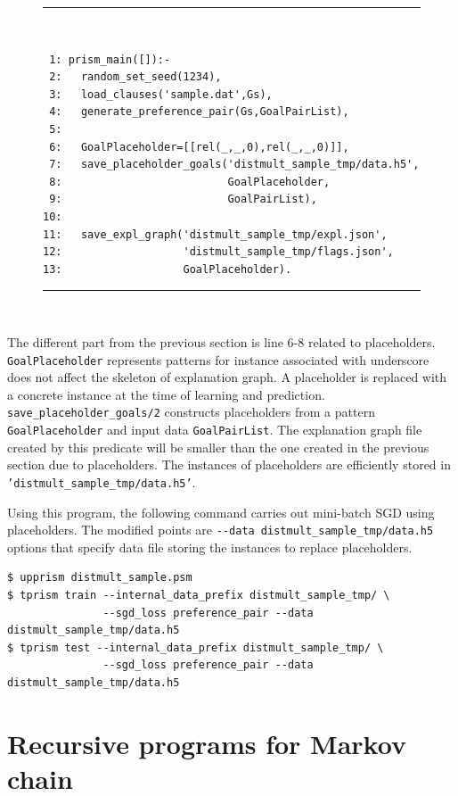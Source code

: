 \documentclass[a4paper]{report}
\begin{document}
\begin{figure}[h]
	\rule{0.85\textwidth}{0.10mm}\\ [-1em]
\begin{verbatim}
 1: prism_main([]):-
 2:   random_set_seed(1234),
 3:   load_clauses('sample.dat',Gs),
 4:   generate_preference_pair(Gs,GoalPairList),
 5:
 6:   GoalPlaceholder=[[rel(_,_,0),rel(_,_,0)]],
 7:   save_placeholder_goals('distmult_sample_tmp/data.h5',
 8:                          GoalPlaceholder,
 9:                          GoalPairList),
10: 
11:   save_expl_graph('distmult_sample_tmp/expl.json',
12:                   'distmult_sample_tmp/flags.json',
13:                   GoalPlaceholder).
\end{verbatim}
\rule{0.85\textwidth}{0.10mm}\\ [-1em]
\end{figure}

The different part from the previous section is line 6-8  related to placeholders.
{\tt GoalPlaceholder} represents patterns for 
instance associated with underscore does not affect the skeleton of explanation graph.
A placeholder is replaced with a concrete instance at the time of learning and prediction.
{\tt save\_placeholder\_goals/2} constructs placeholders from a pattern {\tt GoalPlaceholder} and input data {\tt GoalPairList}.
The explanation graph file created by this predicate will be smaller than the one created in the previous section due to placeholders.
The instances of placeholders are efficiently stored in {\tt 'distmult\_sample\_tmp/data.h5'}.


Using this program, the following command carries out mini-batch SGD using placeholders.
The modified points are \verb|--data distmult_sample_tmp/data.h5| options that specify data file storing the instances to replace placeholders.
\begin{verbatim}
$ upprism distmult_sample.psm
$ tprism train --internal_data_prefix distmult_sample_tmp/ \
               --sgd_loss preference_pair --data distmult_sample_tmp/data.h5 
$ tprism test --internal_data_prefix distmult_sample_tmp/ \
               --sgd_loss preference_pair --data distmult_sample_tmp/data.h5 
\end{verbatim}

\section{Recursive programs for Markov chain}
\label{sec:markov_chain}
\end{document}
